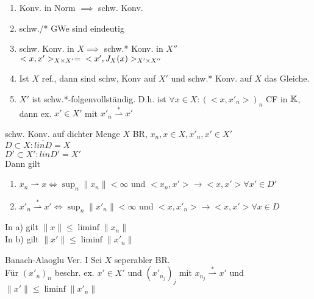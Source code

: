 \begin{bemerkung}
    \begin{enumerate}
        \item Konv. in Norm \(\implies\) schw. Konv.
        \item schw./* GWe sind eindeutig
        \item schw. Konv. in \(X \implies\) schw.* Konv. in \(X''\)\\
            \(<x,x'>_{X\times X'} = \\ <x',J_X(x)>_{X' \times X''}\)
        \item Ist \(X\) ref., dann sind schw, Konv auf \(X'\) und schw.* Konv.
            auf \(X\) das Gleiche.
        \item \(X'\) ist schw.*-folgenvollständig. D.h. ist \(\forall x \in X:
            ( <x,x'_n>)_n\) CF in \(\mathbb{K}\), dann ex. \(x' \in X'\) mit 
            \(x'_n \stackrel{*}{\rightharpoonup}x'\)
    \end{enumerate}
\end{bemerkung}

\begin{satz}{schw. Konv. auf dichter Menge}
    \(X\) BR, \(x_n,x\in X, x'_n,x'\in X'\)\\
    \(D\subset X: \overline{linD} = X\)\\
    \(D'\subset X': \overline{linD'} = X'\)\\
    Dann gilt
    \begin{enumerate}[label = (\alph*)]
        \item \(x_n \rightharpoonup x \Leftrightarrow \sup_n \|x_n\| < \infty\)
            und \(<x_n,x'> \to <x,x'> \forall x'\in D'\)
        \item \(x'_n \stackrel{*}{\rightharpoonup} x' \Leftrightarrow
            \sup_n \|x'_n\| < \infty\) und \(<x,x'_n> \to <x, x'>
            \forall x\in D\)
    \end{enumerate}
    In a) gilt \(\|x\| \leq \liminf \|x_n\|\)\\
    In b) gilt \(\|x'\| \leq \liminf \|x'_n\|\)
\end{satz}

\begin{satz}{Banach-Alaoglu Ver. I}
    Sei \(X\) seperabler BR.\\ Für \((x'_n)_n\) beschr. ex. \(x'\in X'\) und
    \((x'_{n_j})_j\) mit \(x_{n_j} \stackrel{*}{\rightharpoonup} x'\) und
    \(\|x'\| \leq \liminf \|x'_n\|\)
\end{satz}

